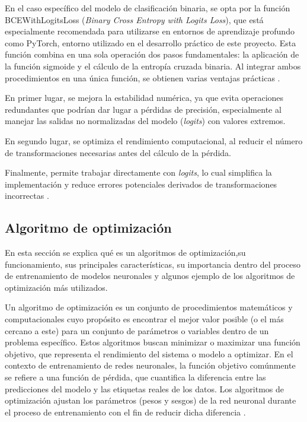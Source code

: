 En el caso específico del modelo de clasificación binaria, se opta por la función BCEWithLogitsLoss (\textit{Binary Cross Entropy with Logits Loss}), que está especialmente recomendada para utilizarse en entornos de aprendizaje profundo como PyTorch, entorno utilizado en el desarrollo práctico de este proyecto. Esta función combina en una sola operación dos pasos fundamentales: la aplicación de la función sigmoide y el cálculo de la entropía cruzada binaria. Al integrar ambos procedimientos en una única función, se obtienen varias ventajas prácticas \cite{datacamp_loss_function}.

En primer lugar, se mejora la estabilidad numérica, ya que evita operaciones redundantes que podrían dar lugar a pérdidas de precisión, especialmente al manejar las salidas no normalizadas del modelo (\textit{logits}) con valores extremos.

En segundo lugar, se optimiza el rendimiento computacional, al reducir el número de transformaciones necesarias antes del cálculo de la pérdida. 

Finalmente, permite trabajar directamente con \textit{logits}, lo cual simplifica la implementación y reduce errores potenciales derivados de transformaciones incorrectas \cite{bigdatafran_pytorch_classification}.




\subsection{Algoritmo de optimización}\label{sec:alg-opt}
En esta sección se explica qué es un algoritmos de optimización,su funcionamiento, sus principales características, su importancia dentro del proceso de entrenamiento de modelos neuronales y algunos ejemplo de los algoritmos de optimización más utilizados.

Un algoritmo de optimización es un conjunto de procedimientos matemáticos y computacionales cuyo propósito es encontrar el mejor valor posible (o el más cercano a este) para un conjunto de parámetros o variables dentro de un problema específico. Estos algoritmos buscan minimizar o maximizar una función objetivo, que representa el rendimiento del sistema o modelo a optimizar. En el contexto de entrenamiento de redes neuronales, la función objetivo comúnmente se refiere a una función de pérdida, que cuantifica la diferencia entre las predicciones del modelo y las etiquetas reales de los datos. Los algoritmos de optimización ajustan los parámetros (pesos y sesgos) de la red neuronal durante el proceso de entrenamiento con el fin de reducir dicha diferencia \cite{goodfellow2016deep}.


